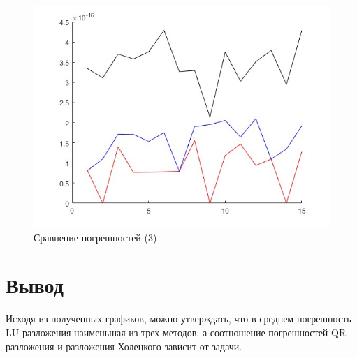 \documentclass[a4paper,12pt]{article}
\begin{document}
	\begin{figure}[H]
		\centering
		\includegraphics[width=0.7\linewidth]{polytech/calc-math/report-lab3/subfiles/slau3}
		\caption{Сравнение погрешностей (3)}
		\label{fig:graph}
	\end{figure}
	
	\section{Вывод}
	Исходя из полученных графиков, можно утверждать, что в среднем погрешность LU-разложения наименьшая
	из трех методов, а соотношение погрешностей QR-разложения и разложения Холецкого зависит от задачи.
\end{document}
